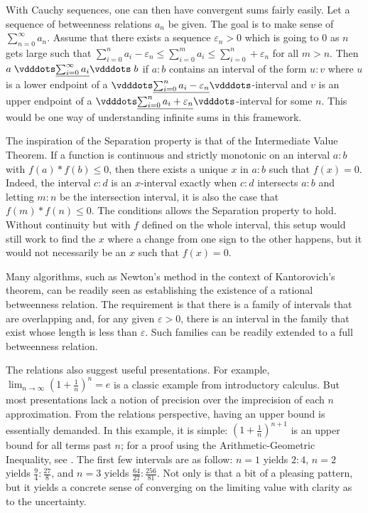 \documentclass{rmj-public}
\begin{document}
With Cauchy sequences, one can then have convergent sums fairly easily. Let a sequence of betweenness relations $a_n$ be given. The goal is to make sense of $\sum_{n=0}^{\infty} a_n$. Assume that there exists a sequence $\varepsilon_n > 0$ which is going to 0 as $n$ gets large such that $\sum_{i=0}^n a_i - \varepsilon_n \leq \sum_{i=0}^m a_i \leq \sum_{i=0}^n + \varepsilon_n$ for all $m > n$. Then  $a \xrel[\sum_{i=0}^{\infty} a_i] b$ if $a:b$ contains an interval of the form $u:v$ where $u$ is a lower endpoint of a $\xrel[\sum_{i=0}^n a_i - \varepsilon_n ]$-interval and $v$ is an upper endpoint of a $\xrel[\sum_{i=0}^n a_i + \varepsilon_n ]$-interval for some $n$. This would be one way of understanding infinite sums in this framework. 

The inspiration of the Separation property is that of the Intermediate Value Theorem. If a function is continuous and strictly monotonic on an interval $a:b$ with $f(a)*f(b) \leq 0$, then there exists a unique $x$ in $a:b$ such that $f(x) = 0$. Indeed, the interval $c:d$ is an $x$-interval exactly when $c:d$ intersects $a:b$ and letting $m:n$ be the intersection interval, it is also the case that $f(m)*f(n) \leq 0$. The conditions allows the Separation property to hold. Without continuity but with $f$ defined on the whole interval, this setup would still work to find the $x$ where a change from one sign to the other  happens, but it would not necessarily be an $x$ such that $f(x) = 0$.

Many algorithms, such as Newton's method in the context of Kantorovich's theorem, can be readily seen as establishing the existence of a rational betweenness relation. The requirement is that there is a family of intervals that are overlapping and, for any given $\varepsilon >0$, there is an interval in the family that exist whose length is less than $\varepsilon$. Such families can be readily extended to a full betweenness relation. 

The relations also suggest useful presentations. For example, $\lim_{n \to \infty} (1+\frac{1}{n})^n = e$ is a classic example from introductory calculus. But most presentations lack a notion of precision over the imprecision of each $n$ approximation. From the relations perspective, having an upper bound is essentially demanded. In this example, it is simple: $(1 + \frac{1}{n})^{n+1}$ is an upper bound for all terms past $n$; for a proof using the Arithmetic-Geometric Inequality, see \cite{mend}. The first few intervals are as follow: $n=1$ yields $2:4$, $n=2$ yields $\frac{9}{4}:\frac{27}{8}$, and $n=3$ yields $\frac{64}{27}:\frac{256}{81}$. Not only is that a bit of a pleasing pattern, but it yields a concrete sense of converging on the limiting  value with clarity as to the uncertainty. 
\end{document}

